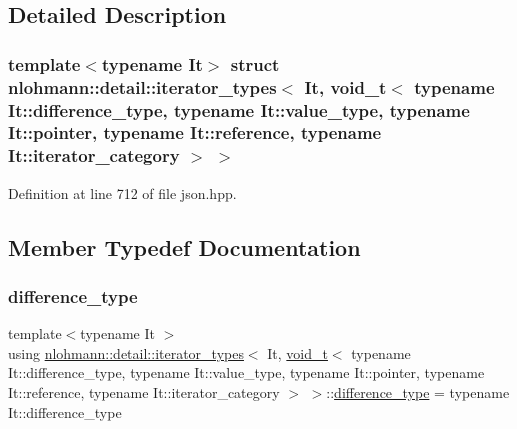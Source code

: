 \subsection{Detailed Description}
\subsubsection*{template$<$typename It$>$\newline
struct nlohmann\+::detail\+::iterator\+\_\+types$<$ It, void\+\_\+t$<$ typename It\+::difference\+\_\+type, typename It\+::value\+\_\+type, typename It\+::pointer, typename It\+::reference, typename It\+::iterator\+\_\+category $>$ $>$}



Definition at line 712 of file json.\+hpp.



\subsection{Member Typedef Documentation}
\mbox{\label{structnlohmann_1_1detail_1_1iterator__types_3_01_it_00_01void__t_3_01typename_01_it_1_1differenc4a413e9bd546446175f10f15c5631361_a1ce16c1c8c1d6a195f5a3d3ad31820f0}} 
\subsubsection{\texorpdfstring{difference\_type}{difference\_type}}
{\footnotesize\ttfamily template$<$typename It $>$ \\
using \mbox{\hyperlink{structnlohmann_1_1detail_1_1iterator__types}{nlohmann\+::detail\+::iterator\+\_\+types}}$<$ It, \mbox{\hyperlink{namespacenlohmann_1_1detail_a92a167c49c6697b6ffe4f79492c705e5}{void\+\_\+t}}$<$ typename It\+::difference\+\_\+type, typename It\+::value\+\_\+type, typename It\+::pointer, typename It\+::reference, typename It\+::iterator\+\_\+category $>$ $>$\+::\mbox{\hyperlink{structnlohmann_1_1detail_1_1iterator__types_3_01_it_00_01void__t_3_01typename_01_it_1_1differenc4a413e9bd546446175f10f15c5631361_a1ce16c1c8c1d6a195f5a3d3ad31820f0}{difference\+\_\+type}} =  typename It\+::difference\+\_\+type}



